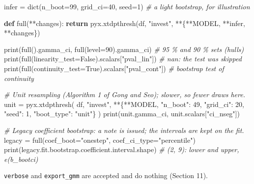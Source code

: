 \documentclass[
  10.5pt,
  a4paper,
]{article}
\newenvironment{Shaded}{}{}
\newcommand{\BuiltInTok}[1]{\textcolor[rgb]{0.00,0.50,0.00}{#1}}
\newcommand{\CommentTok}[1]{\textcolor[rgb]{0.38,0.63,0.69}{\textit{#1}}}
\newcommand{\ControlFlowTok}[1]{\textcolor[rgb]{0.00,0.44,0.13}{\textbf{#1}}}
\newcommand{\DecValTok}[1]{\textcolor[rgb]{0.25,0.63,0.44}{#1}}
\newcommand{\KeywordTok}[1]{\textcolor[rgb]{0.00,0.44,0.13}{\textbf{#1}}}
\newcommand{\NormalTok}[1]{#1}
\newcommand{\OperatorTok}[1]{\textcolor[rgb]{0.40,0.40,0.40}{#1}}
\newcommand{\StringTok}[1]{\textcolor[rgb]{0.25,0.44,0.63}{#1}}
\newcommand{\VariableTok}[1]{\textcolor[rgb]{0.10,0.09,0.49}{#1}}
\begin{document}
\begin{Shaded}
\begin{Highlighting}[]
\NormalTok{infer }\OperatorTok{=} \BuiltInTok{dict}\NormalTok{(n\_boot}\OperatorTok{=}\DecValTok{99}\NormalTok{, grid\_ci}\OperatorTok{=}\DecValTok{40}\NormalTok{, seed}\OperatorTok{=}\DecValTok{1}\NormalTok{)  }\CommentTok{\# a light bootstrap, for illustration}


\KeywordTok{def}\NormalTok{ full(}\OperatorTok{**}\NormalTok{changes):}
    \ControlFlowTok{return}\NormalTok{ pyx.xtdpthresh(df, }\StringTok{"invest"}\NormalTok{, }\OperatorTok{**}\NormalTok{\{}\OperatorTok{**}\NormalTok{MODEL, }\OperatorTok{**}\NormalTok{infer, }\OperatorTok{**}\NormalTok{changes\})}


\BuiltInTok{print}\NormalTok{(full().gamma\_ci, full(level}\OperatorTok{=}\DecValTok{90}\NormalTok{).gamma\_ci)  }\CommentTok{\# 95 \% and 90 \% sets (hulls)}
\BuiltInTok{print}\NormalTok{(full(linearity\_test}\OperatorTok{=}\VariableTok{False}\NormalTok{).scalars[}\StringTok{"pval\_lin"}\NormalTok{])  }\CommentTok{\# nan: the test was skipped}
\BuiltInTok{print}\NormalTok{(full(continuity\_test}\OperatorTok{=}\VariableTok{True}\NormalTok{).scalars[}\StringTok{"pval\_cont"}\NormalTok{])  }\CommentTok{\# bootstrap test of continuity}

\CommentTok{\# Unit resampling (Algorithm 1 of Gong and Seo); slower, so fewer draws here.}
\NormalTok{unit }\OperatorTok{=}\NormalTok{ pyx.xtdpthresh(}
\NormalTok{    df, }\StringTok{"invest"}\NormalTok{, }\OperatorTok{**}\NormalTok{\{}\OperatorTok{**}\NormalTok{MODEL, }\StringTok{"n\_boot"}\NormalTok{: }\DecValTok{49}\NormalTok{, }\StringTok{"grid\_ci"}\NormalTok{: }\DecValTok{20}\NormalTok{, }\StringTok{"seed"}\NormalTok{: }\DecValTok{1}\NormalTok{, }\StringTok{"boot\_type"}\NormalTok{: }\StringTok{"unit"}\NormalTok{\}}
\NormalTok{)}
\BuiltInTok{print}\NormalTok{(unit.gamma\_ci, unit.scalars[}\StringTok{"ci\_nseg"}\NormalTok{])}

\CommentTok{\# Legacy coefficient bootstrap: a note is issued; the intervals are kept on the fit.}
\NormalTok{legacy }\OperatorTok{=}\NormalTok{ full(coef\_boot}\OperatorTok{=}\StringTok{"onestep"}\NormalTok{, coef\_ci\_type}\OperatorTok{=}\StringTok{"percentile"}\NormalTok{)}
\BuiltInTok{print}\NormalTok{(legacy.fit.bootstrap.coefficient.interval.shape)  }\CommentTok{\# (2, 9): lower and upper, e(b\_bootci)}
\end{Highlighting}
\end{Shaded}

\texttt{verbose} and \texttt{export\_gmm} are accepted and do nothing
(Section 11).
\end{document}
